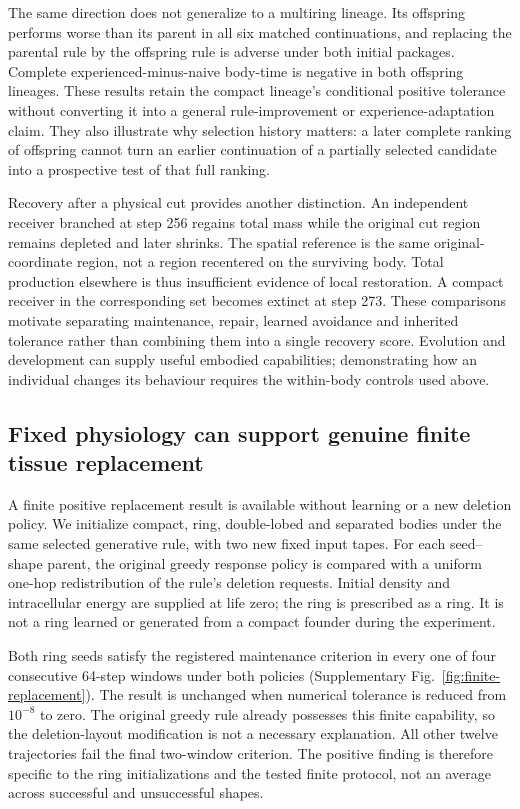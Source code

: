 The same direction does not generalize to a multiring lineage. Its offspring performs worse than its parent in all six matched continuations, and replacing the parental rule by the offspring rule is adverse under both initial packages. Complete experienced-minus-naive body-time is negative in both offspring lineages. These results retain the compact lineage's conditional positive tolerance without converting it into a general rule-improvement or experience-adaptation claim. They also illustrate why selection history matters: a later complete ranking of offspring cannot turn an earlier continuation of a partially selected candidate into a prospective test of that full ranking.


Recovery after a physical cut provides another distinction. An independent receiver branched at step 256 regains total mass while the original cut region remains depleted and later shrinks. The spatial reference is the same original-coordinate region, not a region recentered on the surviving body. Total production elsewhere is thus insufficient evidence of local restoration. A compact receiver in the corresponding set becomes extinct at step 273. These comparisons motivate separating maintenance, repair, learned avoidance and inherited tolerance rather than combining them into a single recovery score. Evolution and development can supply useful embodied capabilities\cite{gupta2021,kriegman,duran,colizzi}; demonstrating how an individual changes its behaviour requires the within-body controls used above.

\subsection*{Fixed physiology can support genuine finite tissue replacement}

A finite positive replacement result is available without learning or a new deletion policy. We initialize compact, ring, double-lobed and separated bodies under the same selected generative rule, with two new fixed input tapes. For each seed--shape parent, the original greedy response policy is compared with a uniform one-hop redistribution of the rule's deletion requests. Initial density and intracellular energy are supplied at life zero; the ring is prescribed as a ring. It is not a ring learned or generated from a compact founder during the experiment.

Both ring seeds satisfy the registered maintenance criterion in every one of four consecutive 64-step windows under both policies (Supplementary Fig.~\ref{fig:finite-replacement}). The result is unchanged when numerical tolerance is reduced from $10^{-8}$ to zero. The original greedy rule already possesses this finite capability, so the deletion-layout modification is not a necessary explanation. All other twelve trajectories fail the final two-window criterion. The positive finding is therefore specific to the ring initializations and the tested finite protocol, not an average across successful and unsuccessful shapes.

